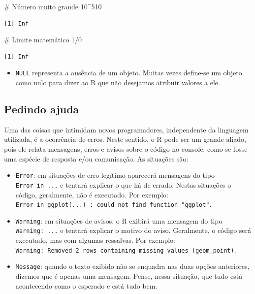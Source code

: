 \documentclass[
  12pt,
  letterpaper,
  DIV=11,
  numbers=noendperiod]{scrreprt}
\newenvironment{Shaded}{\begin{snugshade}}{\end{snugshade}}
\newcommand{\CommentTok}[1]{\textcolor[rgb]{0.37,0.37,0.37}{#1}}
\newcommand{\DecValTok}[1]{\textcolor[rgb]{0.68,0.00,0.00}{#1}}
\newcommand{\SpecialCharTok}[1]{\textcolor[rgb]{0.37,0.37,0.37}{#1}}
\providecommand{\tightlist}{%
  \setlength{\itemsep}{0pt}\setlength{\parskip}{0pt}}\usepackage{longtable,booktabs,array}
\theoremstyle{definition}
\theoremstyle{exemplo}
\begin{document}
\begin{Shaded}
\begin{Highlighting}[]
\CommentTok{\# Número muito grande}
\DecValTok{10}\SpecialCharTok{\^{}}\DecValTok{510}
\end{Highlighting}
\end{Shaded}

\begin{verbatim}
[1] Inf
\end{verbatim}

\begin{Shaded}
\begin{Highlighting}[]
\CommentTok{\# Limite matemático}
\DecValTok{1}\SpecialCharTok{/}\DecValTok{0}
\end{Highlighting}
\end{Shaded}

\begin{verbatim}
[1] Inf
\end{verbatim}

\begin{itemize}
\tightlist
\item
  \texttt{NULL} representa a ausência de um objeto. Muitas vezes
  define-se um objeto como nulo para dizer ao R que não desejamos
  atribuir valores a ele.
\end{itemize}

\subsection{Pedindo ajuda}\label{pedindo-ajuda}

Uma das coisas que intimidam novos programadores, independente da
linguagem utilizada, é a ocorrência de erros. Neste sentido, o R pode
ser um grande aliado, pois ele relata mensagens, erros e avisos sobre o
código no console, como se fosse uma espécie de resposta e/ou
comunicação. As situações são:

\begin{itemize}
\tightlist
\item
  \texttt{Error}: em situações de erro legítimo aparecerá mensagens do
  tipo \texttt{Error\ in\ ...} e tentará explicar o que há de errado.
  Nestas situações o código, geralmente, não é executado. Por exemplo:
  \texttt{Error\ in\ ggplot(...)\ :\ could\ not\ find\ function\ "ggplot"}.
\item
  \texttt{Warning}: em situações de avisos, o R exibirá uma mensagem do
  tipo \texttt{Warning:\ ...} e tentará explicar o motivo do aviso.
  Geralmente, o código será executado, mas com algumas ressalvas. Por
  exemplo:
  \texttt{Warning:\ Removed\ 2\ rows\ containing\ missing\ values\ (geom\_point)}.
\item
  \texttt{Message}: quando o texto exibido não se enquadra nas duas
  opções anteriores, dizemos que é apenas uma mensagem. Pense, nessa
  situação, que tudo está acontecendo como o esperado e está tudo bem.
\end{itemize}
\end{document}

